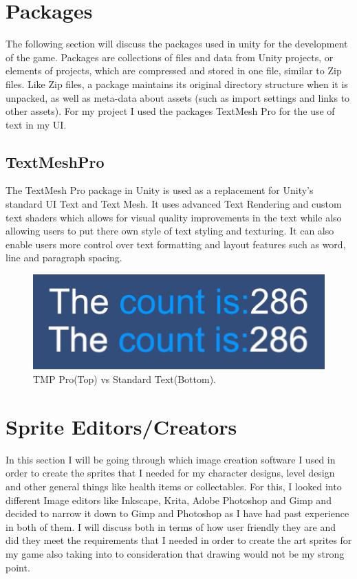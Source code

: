 \newpage

\section{Packages}
The following section will discuss the packages used in unity for the development of the game. Packages are collections of files and data from Unity projects, or elements of projects, which are compressed and stored in one file, similar to Zip files. Like Zip files, a package maintains its original directory structure when it is unpacked, as well as meta-data about assets (such as import settings and links to other assets). For my project I used the packages TextMesh Pro for the use of text in my UI.\cite{UnityPackages}

\subsection{TextMeshPro}
The TextMesh Pro package in Unity is used as a replacement for Unity's standard UI Text and Text Mesh. It uses advanced Text Rendering and custom text shaders which allows for visual quality improvements in the text while also allowing users to put there own style of text styling and texturing. It can also enable users more control over text formatting and layout features such as word, line and paragraph spacing.\cite{TMPRO}

\begin{figure}[h]
  \includegraphics[width=\linewidth]{Images/TMProTopvStandardBottom.PNG}
  \caption{TMP Pro(Top) vs Standard Text(Bottom).}
  \label{fig:TMP V Text}
\end{figure}




\section{Sprite Editors/Creators}

In this section I will be going through which image creation software I used in order to create the sprites that I needed for my character designs, level design and other general things like health items or collectables. For this, I looked into different Image editors like Inkscape, Krita, Adobe Photoshop and Gimp and decided to narrow it down to Gimp and Photoshop as I have had past experience in both of them. I will discuss both in terms of how user friendly they are and did they meet the requirements that I needed in order to create the art sprites for my game also taking into to consideration that drawing would not be my strong point.
\newpage

